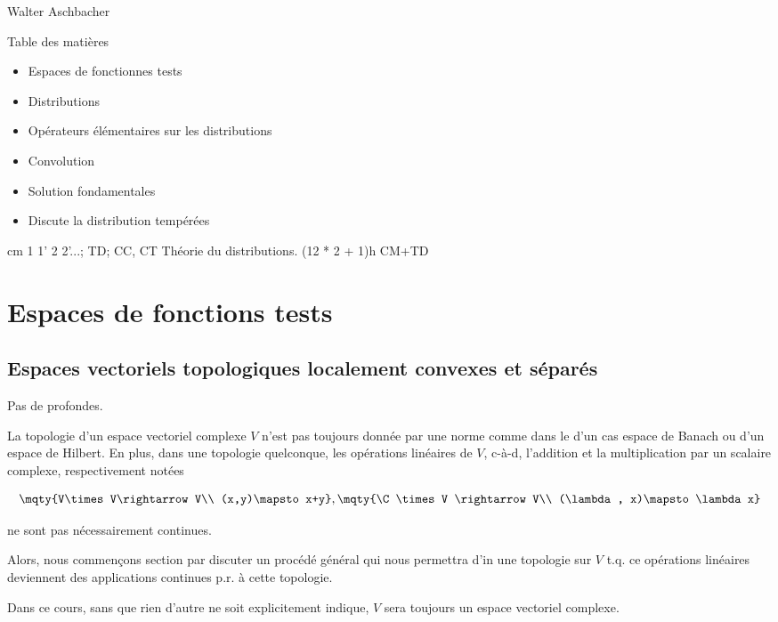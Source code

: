 
Walter Aschbacher

Table des matières

	\begin{itemize}
		\item Espaces de fonctionnes tests
		\item Distributions
		\item Opérateurs élémentaires sur les distributions
		\item Convolution
		\item Solution fondamentales
		\item Discute la distribution tempérées
	\end{itemize}
	
cm 1 1' 2 2'...;
TD; CC, CT 
Théorie du distributions. (12 * 2 + 1)h CM+TD 




\chapter{Espaces de fonctions tests} %
\label{cha:espaces_de_fonctions_tests}

\section{Espaces vectoriels topologiques localement convexes et séparés} %
\label{sec:espaces_de_fonctions_tests}
Pas de profondes.

La topologie d'un espace vectoriel complexe $V$ n'est pas toujours donnée par une norme comme dans le d'un cas espace de Banach ou d'un espace de Hilbert.
En plus, dans une topologie quelconque, les opérations linéaires de $V$, c-à-d, l'addition et la multiplication par un scalaire complexe, respectivement notées 

\[
	\mqty{V\times V\rightarrow V\\
	(x,y)\mapsto x+y},
	\mqty{\C\times V \rightarrow  V\\
	(\lambda, x)\mapsto \lambda x}
\]


ne sont pas nécessairement continues.

Alors, nous commençons section par discuter un procédé général qui nous permettra d'in une topologie sur $V$ t.q. ce opérations linéaires deviennent des applications continues p.r. à cette topologie.


Dans ce cours, sans que rien d'autre ne soit explicitement indique, $V$ sera toujours un espace vectoriel complexe.

